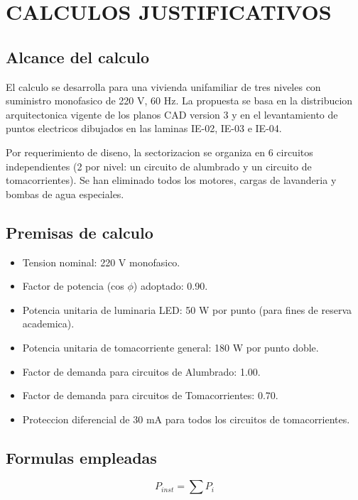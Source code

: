 \chapter{CALCULOS JUSTIFICATIVOS}

\section{Alcance del calculo}

El calculo se desarrolla para una vivienda unifamiliar de tres niveles con suministro monofasico de 220 V, 60 Hz. La propuesta se basa en la distribucion arquitectonica vigente de los planos CAD version 3 y en el levantamiento de puntos electricos dibujados en las laminas IE-02, IE-03 e IE-04.

Por requerimiento de diseno, la sectorizacion se organiza en 6 circuitos independientes (2 por nivel: un circuito de alumbrado y un circuito de tomacorrientes). Se han eliminado todos los motores, cargas de lavanderia y bombas de agua especiales.

\section{Premisas de calculo}

\begin{itemize}
  \item Tension nominal: 220 V monofasico.
  \item Factor de potencia (cos $\phi$) adoptado: 0.90.
  \item Potencia unitaria de luminaria LED: 50 W por punto (para fines de reserva academica).
  \item Potencia unitaria de tomacorriente general: 180 W por punto doble.
  \item Factor de demanda para circuitos de Alumbrado: 1.00.
  \item Factor de demanda para circuitos de Tomacorrientes: 0.70.
  \item Proteccion diferencial de 30 mA para todos los circuitos de tomacorrientes.
\end{itemize}

\section{Formulas empleadas}

\begin{equation}
P_{inst} = \sum P_i
\end{equation}


